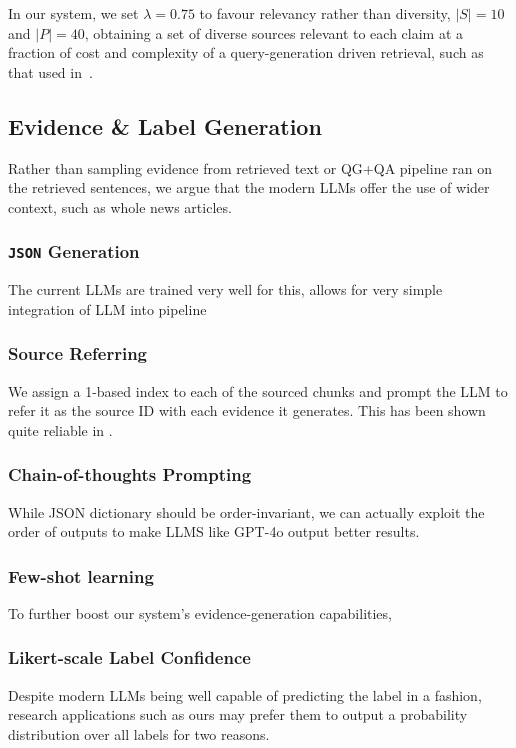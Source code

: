 In our system, we set $\lambda=0.75$ to favour relevancy rather than diversity, $|S|=10$ and $|P| = 40$, obtaining a set of diverse sources relevant to each claim at a fraction of cost and complexity of a query-generation driven retrieval, such as that used in~\cite{averitec2024}.

\subsection{Evidence \& Label Generation}
\label{sec:generation}
Rather than sampling evidence from retrieved text or QG+QA pipeline ran on the retrieved sentences, we argue that the modern LLMs offer the use of wider context, such as whole news articles.

\subsubsection{\texttt{JSON} Generation}
The current LLMs are trained very well for this, allows for very simple integration of LLM into pipeline

\subsubsection{Source Referring}
We assign a 1-based index to each of the sourced chunks and prompt the LLM to refer it as the source ID with each evidence it generates.
This has been shown quite reliable in .

\subsubsection{Chain-of-thoughts Prompting}
While JSON dictionary should be order-invariant, we can actually exploit the order of outputs to make LLMS like GPT-4o output better results.

\subsubsection{Few-shot learning}
To further boost our system's evidence-generation capabilities, 

\subsubsection{Likert-scale Label Confidence}
\label{likert}
Despite modern LLMs being well capable of predicting the label in a  fashion, research applications such as ours may prefer them to output a probability distribution over all labels for two reasons.

